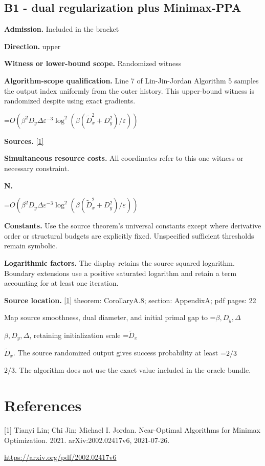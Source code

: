 \documentclass[10pt,a4paper]{article}
\newcommand{\AtlasMath}[1]{\par\begingroup\centering\setbox0=\hbox{$\displaystyle #1$}\ifdim\wd0>1.4\linewidth\typeout{ATLAS WIDE FORMULA: \the\wd0}\fi\ifdim\wd0>\linewidth\resizebox{\linewidth}{!}{\box0}\else\box0\fi\par\endgroup}
\newcommand{\AtlasInlineMath}[1]{\begingroup\setbox0=\hbox{$#1$}\ifdim\wd0>.4\linewidth\endgroup\AtlasMath{#1}\else\endgroup$#1$\fi}
\begin{document}
\subsection{B1 - dual regularization plus Minimax-PPA}
\textbf{Admission.} Included in the bracket

\textbf{Direction.} upper

\textbf{Witness or lower-bound scope.} Randomized witness

\textbf{Algorithm-scope qualification.} Line 7 of Lin-Jin-Jordan Algorithm 5 samples the output index uniformly from the outer history. This upper-bound witness is randomized despite using exact gradients.

\AtlasMath{O(\beta^2D_y\Delta\varepsilon^{-3}\log^2(\beta(\widetilde{D}_x^2+D_y^2)/\varepsilon))}
\textbf{Sources.} \href{https://arxiv.org/pdf/2002.02417v6}{[1]}

\textbf{Simultaneous resource costs.} All coordinates refer to this one witness or necessary constraint.

\textbf{N.}

\AtlasMath{O(\beta^2D_y\Delta\varepsilon^{-3}\log^2(\beta(\widetilde D_x^2+D_y^2)/\varepsilon))}
\textbf{Constants.} Use the source theorem’s universal constants except where derivative order or structural budgets are explicitly fixed. Unspecified sufficient thresholds remain symbolic.

\textbf{Logarithmic factors.} The display retains the source squared logarithm. Boundary extensions use a positive saturated logarithm and retain a term accounting for at least one iteration.

\textbf{Source location.} \href{https://arxiv.org/pdf/2002.02417v6}{[1]} theorem: CorollaryA.8; section: AppendixA; pdf pages: 22

Map source smoothness, dual diameter, and initial primal gap to \AtlasInlineMath{\beta,D_y,\Delta}, retaining initialization scale \AtlasInlineMath{\widetilde D_x}. The source randomized output gives success probability at least \AtlasInlineMath{2/3}. The algorithm does not use the exact value included in the oracle bundle.

\section{References}
[1] Tianyi Lin; Chi Jin; Michael I. Jordan. Near-Optimal Algorithms for Minimax Optimization. 2021. arXiv:2002.02417v6, 2021-07-26.

\url{https://arxiv.org/pdf/2002.02417v6}
\end{document}
